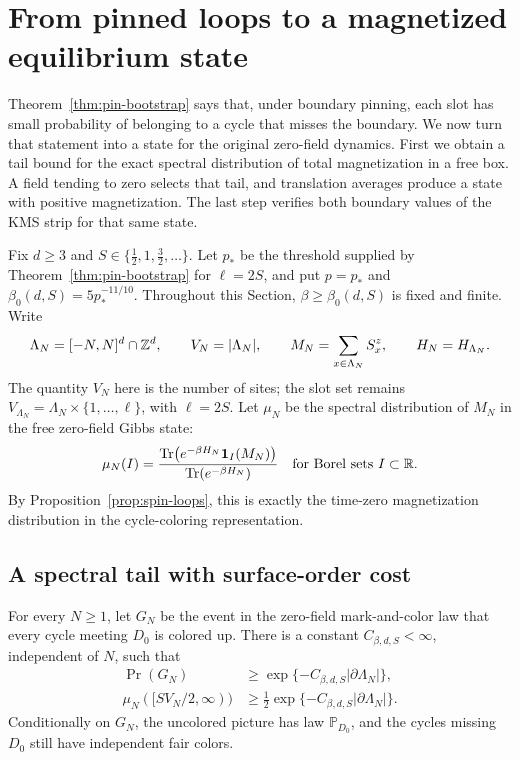 \section{From pinned loops to a magnetized equilibrium state}\label{sec:kms}

Theorem~\ref{thm:pin-bootstrap} says that, under boundary pinning,
each slot has small probability of belonging to a cycle that misses the
boundary.  We now turn that statement into a state for the original
zero-field dynamics.  First we obtain a tail bound for the exact spectral
distribution of total magnetization in a free box.  A field tending to
zero selects that tail, and translation averages produce a state with
positive magnetization.  The last step verifies both boundary values of
the KMS strip for that same state.

Fix \(d\geq3\) and \(S\in\{\tfrac12,1,\tfrac32,\ldots\}\).
Let \(p_*\) be the threshold supplied by Theorem~\ref{thm:pin-bootstrap}
for \(\ell=2S\), and put \(p=p_*\) and
\(\beta_0(d,S)=5p_*^{-11/10}\).  Throughout this Section,
\(\beta\geq\beta_0(d,S)\) is fixed and finite.  Write
\[
 \Lambda_N=[-N,N]^d\cap\mathbb Z^d,\qquad
 V_N=|\Lambda_N|,\qquad
 M_N=\sum_{x\in\Lambda_N}S_x^z,\qquad H_N=H_{\Lambda_N}.
\]
The quantity \(V_N\) here is the number of sites; the slot set remains
\(V_{\Lambda_N}=\Lambda_N\times\{1,\ldots,\ell\}\), with \(\ell=2S\).
Let \(\mu_N\) be the spectral distribution of \(M_N\) in the free
zero-field Gibbs state:
\[
 \mu_N(I)=
 \frac{\operatorname{Tr}\bigl(e^{-\beta H_N}\mathbf 1_I(M_N)\bigr)}
      {\operatorname{Tr}(e^{-\beta H_N})}
 \quad\text{for Borel sets }I\subset\mathbb R.
\]
By Proposition~\ref{prop:spin-loops}, this is exactly the time-zero
magnetization distribution in the cycle-coloring representation.

\subsection{A spectral tail with surface-order cost}

\begin{lemma}\label{lem:surface-cost}
For every \(N\geq1\), let \(G_N\) be the event in the zero-field
mark-and-color law that every cycle meeting \(D_0\) is colored up.  There
is a constant \(C_{\beta,d,S}<\infty\), independent of \(N\), such that
\begin{align}
 \Pr(G_N)&\geq
       \exp\{-C_{\beta,d,S}|\partial\Lambda_N|\},
       \label{eq:boundary-color-cost}\\
 \mu_N([SV_N/2,\infty))&\geq
       \tfrac12\exp\{-C_{\beta,d,S}|\partial\Lambda_N|\}.
       \label{eq:free-spectral-tail}
\end{align}
Conditionally on \(G_N\), the uncolored picture has law
\(\mathbb P_{D_0}\), and the cycles missing \(D_0\) still have
independent fair colors.
\end{lemma}

